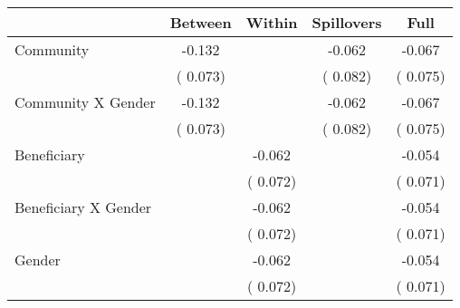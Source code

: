 
\begin{tabular}{l*{4}{c}}\hline&\multicolumn{1}{c}{Between}&\multicolumn{1}{c}{Within}&\multicolumn{1}{c}{Spillovers}&\multicolumn{1}{c}{Full}\\ \hline
 Community                                     &             -0.132      &                                               &       -0.062 &        -0.067                            \\ 
                                                       &        (       0.073)           &                                       &       (       0.082)     &      (       0.075)                                           \\ 
 Community X Gender            &             -0.132      &                                               &       -0.062 &        -0.067                            \\ 
                                                       &        (       0.073)           &                                       &       (       0.082)     &      (       0.075)                                           \\ 
 Beneficiary                           &                                               &       -0.062    &                                &            -0.054                            \\ 
                                                       &                                               & (       0.072)                  &                                        &      (       0.071)                                           \\ 
 Beneficiary X Gender          &                                               &       -0.062    &                                &            -0.054                            \\ 
                                                       &                                               & (       0.072)                  &                                        &      (       0.071)                                           \\ 
 Gender                                        &                              &       -0.062    &                                &            -0.054                            \\ 
                                                       &                                               & (       0.072)                  &                                        &      (       0.071)                                           \\ 

\end{tabular}
